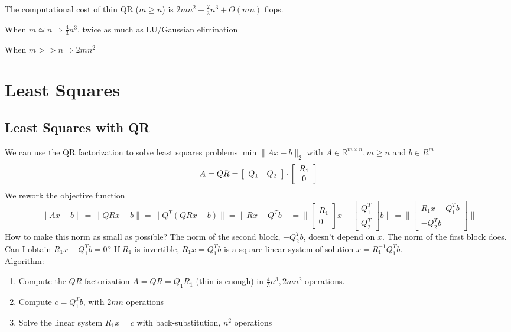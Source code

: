 \documentclass[10pt]{report}
\begin{document}
The computational cost of thin QR ($m\geq n$) is $2mn^2-\frac{2}{3}n^3+ O(mn)$ flops.
\begin{list}{}{}
	\item When $m\simeq n \Rightarrow \frac{4}{3}n^3$, twice as much as LU/Gaussian elimination
	\item When $m>>n\Rightarrow 2mn^2$
\end{list}
\section{Least Squares}
\subsection{Least Squares with QR} We can use the QR factorization to solve least squares problems $\min\|Ax-b\|_2$ with $A\in\mathbb{R}^{m\times n}, m\geq n$ and $b\in R^m$
$$A = QR = \left[\begin{array}{c c}
Q_1&Q_2
\end{array}\right]\cdot\left[\begin{array}{c}
R_1\\0
\end{array}\right]$$
We rework the objective function $$\|Ax-b\| = \|QRx-b\|=\|Q^T(QRx-b)\|=\|Rx-Q^Tb\| =\|\left[\begin{array}{c}
R_1\\0
\end{array}\right]x-\left[\begin{array}{c}
Q_1^T\\Q_2^T
\end{array}\right]b\| = \|\left[\begin{array}{c}
R_1x-Q_1^Tb\\-Q_2^Tb
\end{array}\right]\|$$
How to make this norm as small as possible? The norm of the second block, $-Q_2^Tb$, doesn't depend on $x$. The norm of the first block does. Can I obtain $R_1x - Q_1^Tb = 0$? If $R_1$ is invertible, $R_1x=Q_1^Tb$ is a square linear system of solution $x = R_1^{-1}Q_1^Tb$.\\
Algorithm:
\begin{enumerate}
	\item Compute the $QR$ factorization $A = QR = Q_1R_1$ (thin is enough) in $\frac{4}{3}n^3,2mn^2$ operations.
	\item Compute $c = Q_1^Tb$, with $2mn$ operations
	\item Solve the linear system $R_1x=c$ with back-substitution, $n^2$ operations
\end{enumerate}
\end{document}
